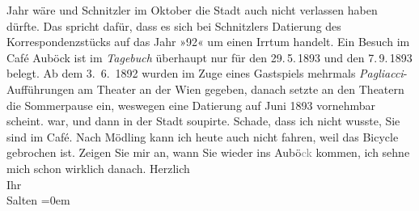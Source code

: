 \begin{ledgroupsized}[t]{13cm}
{{{                  Jahr wäre und Schnitzler im Oktober die
                  Stadt auch nicht verlassen haben dürfte. Das spricht dafür, dass es sich bei Schnitzlers Datierung des Korrespondenzstücks
                  auf das Jahr »92« um einen Irrtum handelt. Ein Besuch im Café Auböck ist im \emph{Tagebuch}
                  überhaupt nur für den 29. 5. 1893 und den 7. 9. 1893 belegt. Ab dem
                     3. 6. 1892 wurden im Zuge eines Gastspiels mehrmals \emph{Pagliacci}-Aufführungen am Theater an der Wien gegeben, danach setzte an den Theatern
                  die Sommerpause ein, weswegen eine Datierung auf Juni 1893 vornehmbar
                  scheint.}}}\label{K_L03120-1h} war, und dann in der Stadt soupirte. Schade, dass ich nicht
               wusste, Sie sind im Café. Nach Mödling kann ich
               heute auch nicht {\pb}fahren, weil das
               Bicycle gebrochen ist. Zeigen Sie mir an, wann Sie wieder ins Aubö\textcolor{gray}{ck} kommen, ich sehne mich schon wirklich danach.\pend
           \pstart
           Herzlich {\\[\baselineskip]}Ihr {\\[\baselineskip]}\spacefill\mbox{Salten}\pend
           \leftskip=0em{}
         
         \endnumbering{}\end{ledgroupsized}\begin{anhang}\end{anhang}\newcommand{\dateiname}{L03120}\newcommand{\titel}{Felix Salten an Arthur Schnitzler, [Juni 1893?]}\newcommand{\editorInnen}{Martin Anton Müller und Laura Untner}
      